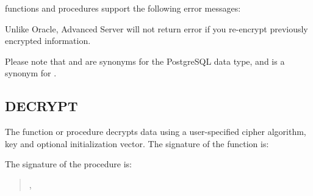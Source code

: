\documentclass[letterpaper,10pt,english,openany,oneside]{sphinxmanual}
\begin{document}
 functions and procedures support the following error
messages:
\begin{quote}



\end{quote}

Unlike Oracle, Advanced Server will not return error  if you
re-encrypt previously encrypted information.

Please note that  and  are synonyms for the PostgreSQL  data
type, and  is a synonym for .

\newpage


\subsection{DECRYPT}
\label{\detokenize{decrypt::doc}}\label{\detokenize{decrypt:decrypt}}
The  function or procedure decrypts data using a user-specified
cipher algorithm, key and optional initialization vector. The signature
of the  function is:
\begin{quote}

\begin{DUlineblock}{0em}
\item[] 
\item[]
\begin{DUlineblock}{\DUlineblockindent}
\item[] 
\item[] 
\end{DUlineblock}
\end{DUlineblock}
\end{quote}

The signature of the  procedure is:
\begin{quote}

\begin{DUlineblock}{0em}
\item[] 
\item[]
\begin{DUlineblock}{\DUlineblockindent}
\item[] ,
\item[] 
\end{DUlineblock}
\end{DUlineblock}
\end{quote}
\end{document}
